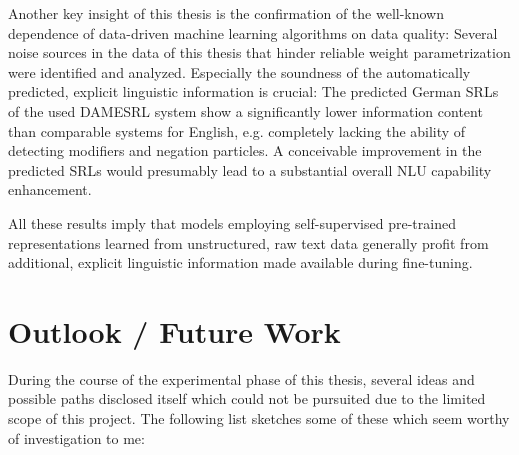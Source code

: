 Another key insight of this thesis is the confirmation of the well-known dependence of data-driven
machine learning algorithms on data quality: Several noise sources in the data of this thesis that
hinder reliable weight parametrization were identified and analyzed. Especially the soundness of
the automatically predicted, explicit linguistic information is crucial: The predicted German
SRLs of the used DAMESRL system show a significantly lower information content than comparable
systems for English, e.g. completely lacking the ability of detecting modifiers and negation
particles. A conceivable improvement in the predicted SRLs would presumably lead to a substantial
overall NLU capability enhancement.

All these results imply that models employing self-supervised pre-trained representations learned
from unstructured, raw text data generally profit from additional, explicit linguistic information
made available during fine-tuning.



\section*{Outlook / Future Work}

During the course of the experimental phase of this thesis, several ideas and possible paths
disclosed itself which could not be pursuited due to the limited scope of this project. The
following list sketches some of these which seem worthy of investigation to me:

